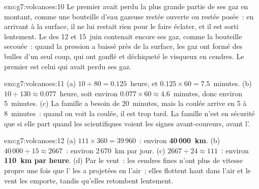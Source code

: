 \begin{solution}{exo:g7:volcanoes:10}
Le premier  avait perdu la plus grande partie de ses gaz en montant,
comme une bouteille d'eau gazeuse restée ouverte ou restée posée~: en
arrivant à la surface, il ne lui restait rien pour le faire éclater, et il
est sorti lentement. Le  des 12 et 15~juin contenait encore ses gaz,
comme la bouteille secouée~: quand la pression a baissé près de la
surface, les gaz ont formé des bulles d'un seul coup, qui ont gonflé et
déchiqueté le  visqueux en cendres. Le premier  est celui qui
avait perdu ses gaz.
\end{solution}

\begin{solution}{exo:g7:volcanoes:11}
(a) $10 \div 80 = 0.125$~heure, et $0.125 \times 60 = 7.5$~minutes. (b)
$10 \div 130 \approx 0.077$~heure, soit environ $0.077 \times 60 \approx
4.6$~minutes, donc environ 5~minutes. (c) La famille a besoin de
20~minutes, mais la coulée arrive en 5 à 8~minutes~: quand on voit la
coulée, il est trop tard. La famille n'est en sécurité que si elle part
quand les scientifiques voient les signes avant-coureurs, avant
l'.
\end{solution}

\begin{solution}{exo:g7:volcanoes:12}
(a) $111 \times 360 = 39\,960$~: environ \textbf{40\,000~km}. (b)
$40\,000 \div 15 \approx 2667$~: environ 2\,670~km par jour. (c)
$2667 \div 24 \approx 111$~: environ \textbf{110~km par heure}. (d) Par le
vent~: les cendres fines n'ont plus de vitesse propre une fois que
l' les a projetées en l'air~; elles flottent haut dans l'air et le
vent les emporte, tandis qu'elles retombent lentement.
\end{solution}

